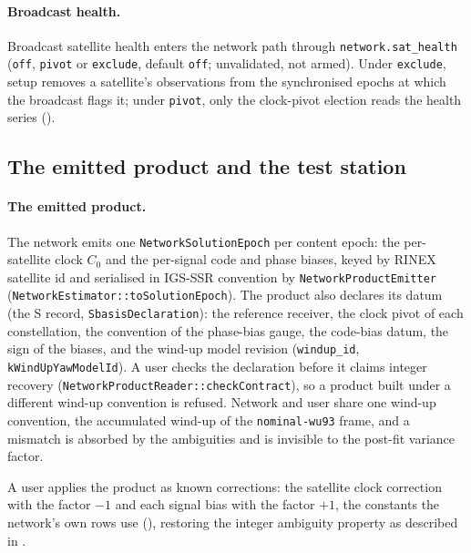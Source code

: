 \documentclass[main.tex]{subfiles}
\begin{document}
\paragraph{Broadcast health.}
Broadcast satellite health enters the network path through
\texttt{network.sat\_health} (\texttt{off}, \texttt{pivot} or
\texttt{exclude}, default \texttt{off}; unvalidated, not armed). Under
\texttt{exclude}, setup removes a satellite's observations from the
synchronised epochs at which the broadcast flags it; under
\texttt{pivot}, only the clock-pivot election reads the health series
().

\subsection{The emitted product and the test station}
\label{sec:net-closedloop}

\paragraph{The emitted product.}
The network emits one \texttt{NetworkSolutionEpoch} per content epoch:
the per-satellite clock $C_0$ and the per-signal code and phase biases,
keyed by RINEX satellite id and serialised in IGS-SSR convention by
\texttt{NetworkProductEmitter}
(\texttt{NetworkEstimator::toSolutionEpoch}). The product also declares
its datum (the S record, \texttt{SbasisDeclaration}): the reference
receiver, the clock pivot of each constellation, the convention of the
phase-bias gauge, the code-bias datum, the sign of the biases, and the
wind-up model revision (\texttt{windup\_id}, \texttt{kWindUpYawModelId}).
A user checks the declaration before it claims integer recovery
(\texttt{NetworkProductReader::checkContract}), so a product built under a
different wind-up convention is refused. Network and user share one
wind-up convention, the accumulated wind-up of the \texttt{nominal-wu93}
frame, and a mismatch is absorbed by the ambiguities and is invisible to
the post-fit variance factor.

A user applies the product as known corrections: the satellite clock
correction with the factor $-1$ and each signal bias with the factor $+1$,
the constants the network's own rows use
(), restoring the integer
ambiguity property as described in
.
\end{document}

